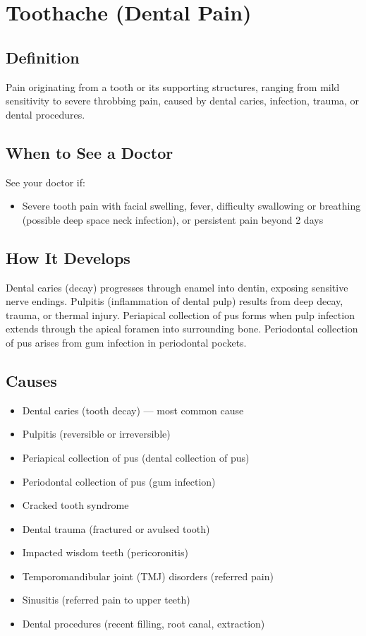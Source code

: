 \chapter{Toothache (Dental Pain)}

\section*{Definition}
Pain originating from a tooth or its supporting structures, ranging from mild sensitivity to severe throbbing pain, caused by dental caries, infection, trauma, or dental procedures.

\section*{When to See a Doctor}
See your doctor if:
\begin{itemize}
  \item Severe tooth pain with facial swelling, fever, difficulty swallowing or breathing (possible deep space neck infection), or persistent pain beyond 2 days
\end{itemize}

\section*{How It Develops}
Dental caries (decay) progresses through enamel into dentin, exposing sensitive nerve endings. Pulpitis (inflammation of dental pulp) results from deep decay, trauma, or thermal injury. Periapical collection of pus forms when pulp infection extends through the apical foramen into surrounding bone. Periodontal collection of pus arises from gum infection in periodontal pockets.

\section*{Causes}
\begin{itemize}
  \item Dental caries (tooth decay) — most common cause
  \item Pulpitis (reversible or irreversible)
  \item Periapical collection of pus (dental collection of pus)
  \item Periodontal collection of pus (gum infection)
  \item Cracked tooth syndrome
  \item Dental trauma (fractured or avulsed tooth)
  \item Impacted wisdom teeth (pericoronitis)
  \item Temporomandibular joint (TMJ) disorders (referred pain)
  \item Sinusitis (referred pain to upper teeth)
  \item Dental procedures (recent filling, root canal, extraction)
\end{itemize}

